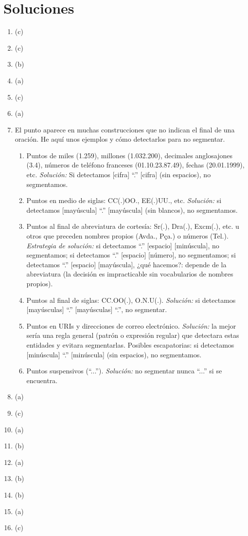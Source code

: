 \section{Soluciones} \begin{enumerate} \item (c) \item (c) \item (b) \item (a) \item (c) \item (a) \item El punto aparece en muchas construcciones que no indican el final de una oración. He aquí unos ejemplos y cómo detectarlos para no segmentar. \begin{enumerate} \item Puntos de miles (1.259), millones (1.032.200), decimales anglosajones (3.4), números de teléfono franceses (01.10.23.87.49), fechas (20.01.1999), etc. \emph{Solución:} Si detectamos [cifra] ``.'' [cifra] (sin espacios), no segmentamos. 

\item Puntos en medio de siglas: CC(.)OO., EE(.)UU., etc. \emph{Solución:} si detectamos [mayúscula] ``.'' [mayúscula] (sin blancos), no segmentamos. 

\item Puntos al final de abreviatura de cortesía: Sr(.), Dra(.), Excm(.), etc. u otros que preceden nombres propios (Avda., Pça.) o números (Tel.). \emph{Estrategia de solución:} si detectamos ``.'' [espacio] [minúscula], no segmentamos; si detectamos ``.'' [espacio] [número], no segmentamos; si detectamos ``.'' [espacio] [mayúscula], ¿qué hacemos?: depende de la abreviatura (la decisión es impracticable sin vocabularios de nombres propios). 

\item Puntos al final de siglas: CC.OO(.), O.N.U(.). \emph{Solución:} si detectamos [mayúsculas] ``.'' [mayúsculas] ``.'', no segmentar. 

\item Puntos en URIs y direcciones de correo electrónico. \emph{Solución:} la mejor sería una regla general (patrón o expresión regular) que detectara estas entidades y evitara segmentarlas. Posibles escapatorias: si detectamos [minúscula] ``.'' [minúscula] (sin espacios), no segmentamos. 

\item Puntos suspensivos (``...''). \emph{Solución:} no segmentar nunca ``...'' si se encuentra. \end{enumerate} 

\item (a) \item (c) \item (a) \item (b) \item (a) \item (b) \item (b) \item (a) \item (c) 

\end{enumerate} 

